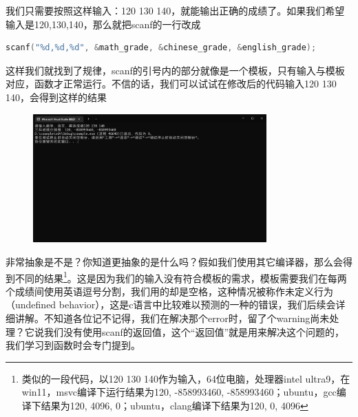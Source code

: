 我们只需要按照这样输入：120 130 140，就能输出正确的成绩了。如果我们希望输入是120,130,140，那么就把scanf的一行改成

\begin{lstlisting}[language=C]
    scanf("%d,%d,%d", &math_grade, &chinese_grade, &english_grade);
\end{lstlisting}

这样我们就找到了规律，scanf的引号内的部分就像是一个模板，只有输入与模板对应，函数才正常运行。不信的话，我们可以试试在修改后的代码输入120 130 140，会得到这样的结果

\begin{figure}[H]
    \centering
    \includegraphics[width=0.8\textwidth, height=0.3\textheight]{images/1scanf出错.png}
\end{figure}

非常抽象是不是？你知道更抽象的是什么吗？假如我们使用其它编译器，那么会得到不同的结果\footnote{类似的一段代码，以120 130 140作为输入，64位电脑，处理器intel ultra9，在win11，msvc编译下运行结果为120, -858993460, -858993460；ubuntu，gcc编译下结果为120, 4096, 0；ubuntu，clang编译下结果为120, 0, 4096}。这是因为我们的输入没有符合模板的需求，模板需要我们在每两个成绩间使用英语逗号分割，我们用的却是空格，这种情况被称作未定义行为（undefined behavior），这是c语言中比较难以预测的一种的错误，我们后续会详细讲解。不知道各位记不记得，我们在解决那个error时，留了个warning尚未处理？它说我们没有使用scanf的返回值，这个“返回值”就是用来解决这个问题的，我们学习到函数时会专门提到。
